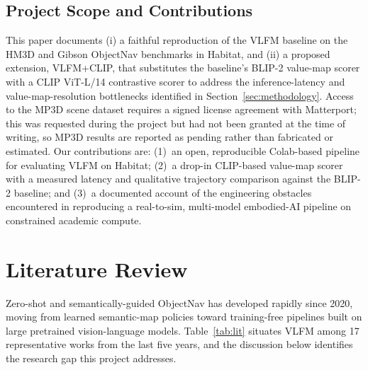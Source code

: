 \documentclass[conference]{IEEEtran}
\begin{document}
\subsection{Project Scope and Contributions}
This paper documents (i) a faithful reproduction of the VLFM baseline on the HM3D and Gibson ObjectNav benchmarks in Habitat, and (ii) a proposed extension, VLFM+CLIP, that substitutes the baseline's BLIP-2 value-map scorer with a CLIP ViT-L/14 contrastive scorer to address the inference-latency and value-map-resolution bottlenecks identified in Section~\ref{sec:methodology}. Access to the MP3D scene dataset requires a signed license agreement with Matterport; this was requested during the project but had not been granted at the time of writing, so MP3D results are reported as pending rather than fabricated or estimated. Our contributions are: (1)~an open, reproducible Colab-based pipeline for evaluating VLFM on Habitat; (2)~a drop-in CLIP-based value-map scorer with a measured latency and qualitative trajectory comparison against the BLIP-2 baseline; and (3)~a documented account of the engineering obstacles encountered in reproducing a real-to-sim, multi-model embodied-AI pipeline on constrained academic compute.

\section{Literature Review}
Zero-shot and semantically-guided ObjectNav has developed rapidly since 2020, moving from learned semantic-map policies toward training-free pipelines built on large pretrained vision-language models. Table~\ref{tab:lit} situates VLFM among 17 representative works from the last five years, and the discussion below identifies the research gap this project addresses.
\end{document}
